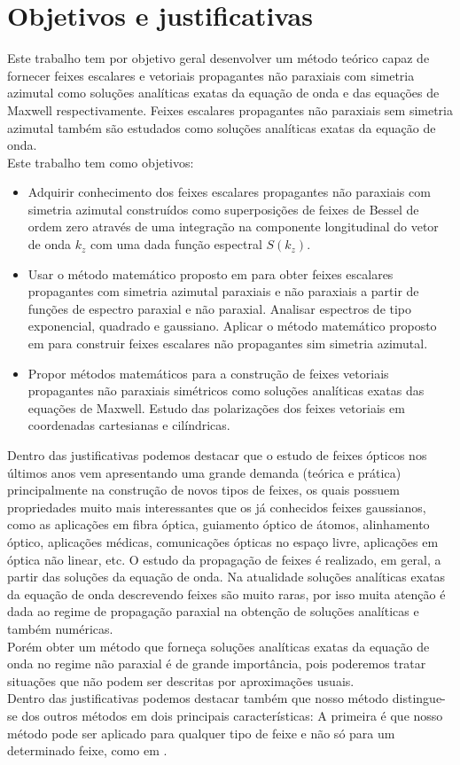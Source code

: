 \section{Objetivos e justificativas}
Este trabalho tem por objetivo geral desenvolver um método teórico capaz de fornecer feixes escalares e vetoriais propagantes não paraxiais com simetria azimutal como soluções analíticas exatas da equação de onda e das equações de Maxwell respectivamente. Feixes escalares propagantes não paraxiais sem simetria azimutal também são estudados como soluções analíticas exatas da equação de onda.\\
Este trabalho tem como objetivos:
\begin{itemize}
\item Adquirir conhecimento dos feixes escalares propagantes não paraxiais com simetria azimutal construídos como superposições de feixes de Bessel de ordem zero através de uma integração na componente longitudinal do vetor de onda $k_z$ com uma dada função espectral $S(k_z)$.
\item Usar o método matemático proposto em  para obter feixes escalares propagantes com simetria azimutal paraxiais e não paraxiais a partir de funções de espectro paraxial e não paraxial. Analisar espectros de tipo exponencial, quadrado e gaussiano. Aplicar o método matemático proposto em  para construir feixes escalares não propagantes sim simetria azimutal. 
\item Propor métodos matemáticos para a construção de feixes vetoriais propagantes não paraxiais simétricos como soluções analíticas exatas das equações de Maxwell. Estudo das polarizações dos feixes vetoriais em coordenadas cartesianas e cilíndricas.
\end{itemize}  
Dentro das justificativas podemos destacar que o estudo de feixes ópticos nos últimos anos vem apresentando uma grande demanda (teórica e prática) principalmente na construção de novos tipos de feixes, os quais possuem propriedades muito mais interessantes que os já conhecidos feixes gaussianos, como as aplicações em fibra óptica, guiamento óptico de átomos, alinhamento óptico, aplicações médicas, comunicações ópticas no espaço livre, aplicações em óptica não linear, etc. O estudo da propagação de feixes é realizado, em geral, a partir das soluções da equação de onda. Na atualidade soluções analíticas exatas da equação de onda descrevendo feixes são muito raras, por isso muita atenção é dada ao regime de propagação paraxial na obtenção de soluções analíticas e também numéricas.\\
Porém obter um método que forneça soluções analíticas exatas da equação de onda no regime não paraxial é de grande importância, pois poderemos tratar situações que não podem ser descritas por aproximações usuais.\\
Dentro das justificativas podemos destacar também que nosso método \cite{Stratton:02} distingue-se dos outros métodos em dois principais características: A primeira é que nosso método pode ser aplicado para qualquer tipo de feixe e não s\'o para um determinado feixe, como em \cite{Stratton:02, Jackson:03,Figueroa:05,Sochacki:1}.
  
